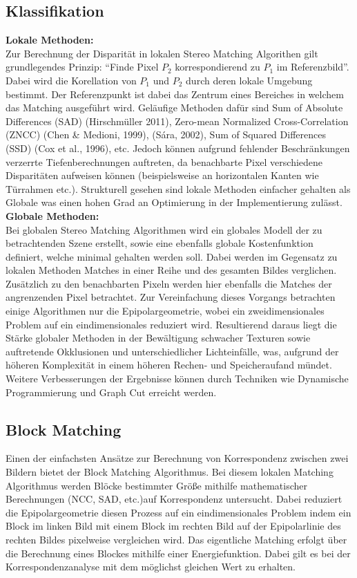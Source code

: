 \subsection{Klassifikation}
\label{subsec:stereo_matching_classification}
\textbf{Lokale Methoden:}\\
Zur Berechnung der Disparität in lokalen Stereo Matching Algorithen gilt grundlegendes Prinzip: “Finde Pixel $P_2$ korrespondierend zu $P_1$ im Referenzbild”. Dabei wird die Korellation von $P_1$ und $P_2$ durch deren lokale Umgebung bestimmt. Der Referenzpunkt ist dabei das Zentrum eines Bereiches in welchem das Matching ausgeführt wird. Geläufige Methoden dafür sind Sum of Absolute Differences (SAD) (Hirschmüller 2011), Zero-mean Normalized Cross-Correlation (ZNCC) (Chen \& Medioni, 1999), (Sára, 2002), Sum of Squared Differences (SSD) (Cox et al., 1996), etc.
Jedoch können aufgrund fehlender Beschränkungen verzerrte Tiefenberechnungen auftreten, da benachbarte Pixel verschiedene Disparitäten aufweisen können (beispielsweise an horizontalen Kanten wie Türrahmen etc.). Strukturell gesehen sind lokale Methoden einfacher gehalten als Globale was einen hohen Grad an Optimierung in der Implementierung zulässt.\\

\noindent
\textbf{Globale Methoden:}\\
Bei globalen Stereo Matching Algorithmen wird ein globales Modell der zu betrachtenden Szene erstellt, sowie eine ebenfalls globale Kostenfunktion definiert, welche minimal gehalten werden soll. Dabei werden im Gegensatz zu lokalen Methoden Matches in einer Reihe und des gesamten Bildes verglichen. Zusätzlich zu den benachbarten Pixeln werden hier ebenfalls die Matches der angrenzenden Pixel betrachtet. Zur Vereinfachung dieses Vorgangs betrachten einige Algorithmen nur die Epipolargeometrie, wobei ein zweidimensionales Problem auf ein eindimensionales reduziert wird. Resultierend daraus liegt die Stärke globaler Methoden in der Bewältigung schwacher Texturen sowie auftretende Okklusionen und unterschiedlicher Lichteinfälle, was, aufgrund der höheren Komplexität in einem höheren Rechen- und Speicheraufand mündet. Weitere Verbesserungen der Ergebnisse können durch Techniken wie Dynamische Programmierung und Graph Cut erreicht werden.

\subsection{Block Matching}
\label{subsec:stereo_matching_bm}
Einen der einfachsten Ansätze zur Berechnung von Korrespondenz zwischen zwei Bildern bietet der Block Matching Algorithmus. Bei diesem lokalen Matching Algorithmus werden Blöcke bestimmter Größe mithilfe mathematischer Berechnungen (NCC, SAD, etc.)auf Korrespondenz untersucht. Dabei reduziert die Epipolargeometrie diesen Prozess auf ein eindimensionales Problem indem ein Block im linken Bild mit einem Block im rechten Bild auf der Epipolarlinie des rechten Bildes pixelweise vergleichen wird. Das eigentliche Matching erfolgt über die Berechnung eines Blockes mithilfe einer Energiefunktion. Dabei gilt es bei der Korrespondenzanalyse mit dem möglichst gleichen Wert zu erhalten. 

